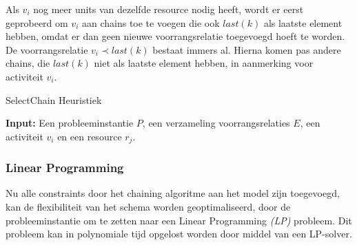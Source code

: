 Als $v_i$ nog meer units van dezelfde resource nodig heeft, wordt er eerst geprobeerd om $v_i$ aan chains toe te voegen die ook $last(k)$ als laatste element hebben, omdat er dan geen nieuwe voorrangsrelatie toegevoegd hoeft te worden. De voorrangsrelatie $v_i \prec last(k)$ bestaat immers al. Hierna komen pas andere chains, die $last(k)$ niet als laatste element hebben, in aanmerking voor activiteit $v_i$.

\begin{algorithm}
\caption{SelectChain Heuristiek \cite{policella2004generating}}
\label{alg:selectchain1}
\textbf{Input:} Een probleeminstantie $P$, een verzameling voorrangsrelaties $E$, een activiteit $v_i$ en een resource $r_j$.
\begin{algorithmic}[1]
  	\Else
  	\EndIf
    			\Else
    			\EndIf
    		\EndFor
    	\EndIf
  \EndFunction
\end{algorithmic}
\end{algorithm}


\subsubsection{Linear Programming}
\label{subsubsec:flexoplossing}
Nu alle constraints door het chaining algoritme aan het model zijn toegevoegd, kan de flexibiliteit van het schema worden geoptimaliseerd, door de probleeminstantie om te zetten naar een Linear Programming \emph{(LP)} probleem. Dit probleem kan in polynomiale tijd opgelost worden door middel van een LP-solver.


